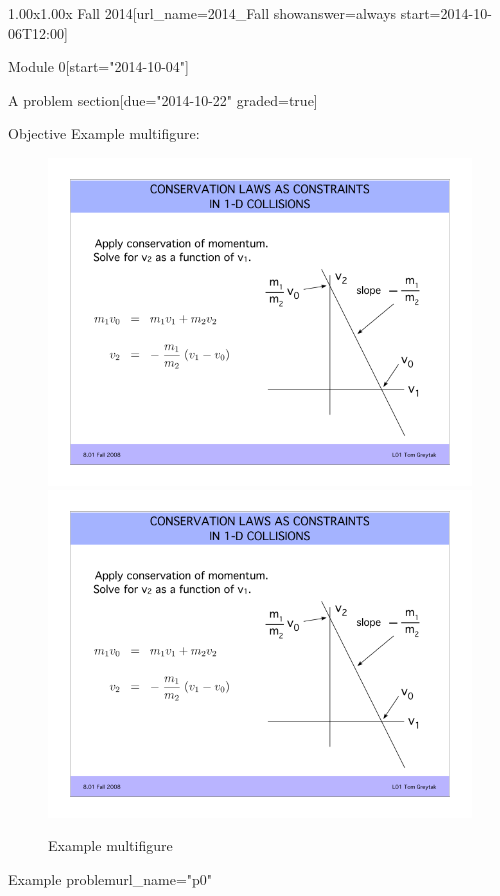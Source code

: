 \documentclass[12pt]{article}
\begin{document}
\begin{edXcourse}{1.00x}{1.00x Fall 2014}[url_name=2014_Fall showanswer=always start=2014-10-06T12:00]
\begin{edXchapter*}{Module 0}[start="2014-10-04"]
\begin{edXsequential}{A problem section}[due="2014-10-22" graded=true]
\begin{edXtext}{Objective}
Example multifigure:
\begin{figure}
  \begin{center}
    \includegraphics{example-image.png}
    \hfill
    \includegraphics{example-image.png}
    \caption{Example multifigure}
    \label{fig:multi}
  \end{center}
\end{figure}

\end{edXtext}

\begin{edXproblem}{Example problem}{url_name="p0"}
 


\end{edXproblem}
\end{edXsequential}
\end{edXchapter*}
\end{edXcourse}
\end{document}
